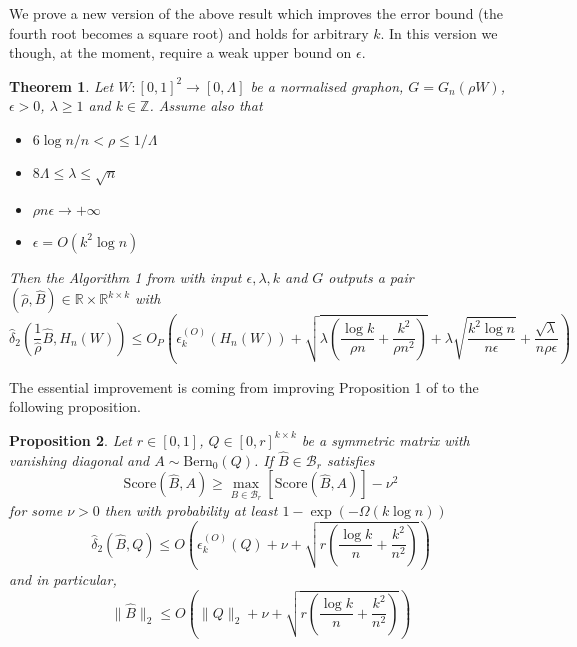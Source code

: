 \documentclass[12pt]{article}
\newtheorem{theorem}{Theorem}[section]
\newtheorem{proposition}[theorem]{Proposition}
\begin{document}
We prove a new version of the above result which improves the error bound (the fourth root becomes a square root) and holds for arbitrary $k$. In this version we though, at the moment, require a weak upper bound on $\epsilon$.
\begin{theorem}\label{stronger}
Let $W: [0,1]^2 \rightarrow [0,\Lambda]$ be a normalised graphon, $G=G_n(\rho W)$, $ \epsilon>0$, $\lambda \geq 1$ and $k \in \mathbb{Z}$. Assume also that
 \begin{itemize}
\item  $6 \log n/n<\rho \leq 1/\Lambda$
\item $8 \Lambda \leq \lambda  \leq \sqrt{n}$
\item $\rho n \epsilon \rightarrow +\infty$
\item $\epsilon=O(k^2 \log n)$
\end{itemize} 
Then the Algorithm 1 from \cite{Borgs2015} with input $\epsilon,\lambda,k$ and $G$ outputs a pair $(\hat{\rho},\hat{B}) \in \mathbb{R} \times \mathbb{R}^{k \times k}$ with
\begin{equation*}
\hat{\delta}_2\left(\frac{1}{\hat{\rho}}\hat{B},H_n(W)\right) \leq O_P\left(\hat{\epsilon}_k^{(O)}( H_n(W))+\sqrt{\lambda  \left(\frac{\log k}{ \rho n}+\frac{k^2}{\rho n^2}\right)} + \lambda  \sqrt{\frac{k^2\log n}{n \epsilon}}+ \frac{\sqrt{\lambda}}{n \rho \epsilon}\right)
\end{equation*}

\end{theorem}
The essential improvement is coming from improving Proposition 1 of \cite{Borgs2015} to the following proposition.
\begin{proposition}\label{prop}
Let $r \in [0,1]$, $Q \in [0,r]^{k \times k}$ be a symmetric matrix with vanishing diagonal and $A \sim \mathrm{Bern_0}(Q)$. If $\hat{B} \in \mathcal{B}_r$ satisfies 
\begin{equation}\label{eq:condition}
\mathrm{Score}\left(\hat{B},A\right) \geq \max_{B \in \mathcal{B}_r}[\mathrm{Score}\left(\hat{B},A\right)]-\nu^2
\end{equation}
for some $\nu>0$ then with probability at least $1-\exp\left(-\Omega(k \log n)\right)$
\begin{equation*}
\hat{\delta}_2\left(\hat{B},Q\right) \leq O\left(\epsilon_k^{(O)}(Q)+\nu+\sqrt{r \left(\frac{\log k}{n}+\frac{k^2}{n^2}\right)}  \right)
\end{equation*}
and in particular,
\begin{equation*}
\|\hat{B}\|_2 \leq O\left(\|Q\|_2+\nu+\sqrt{r \left(\frac{\log k}{n}+\frac{k^2}{n^2}\right)}  \right)
\end{equation*}
\end{proposition}
\end{document}
